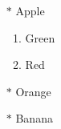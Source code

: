 \documentclass{article}
\begin{document}
\begin{itemize}
\item[$\ast$] Apple
\begin{enumerate}
\item Green
\item Red
\end{enumerate}
\item[$\ast$]Orange
\item[$\ast$] Banana
\end{itemize}
\end{document}
